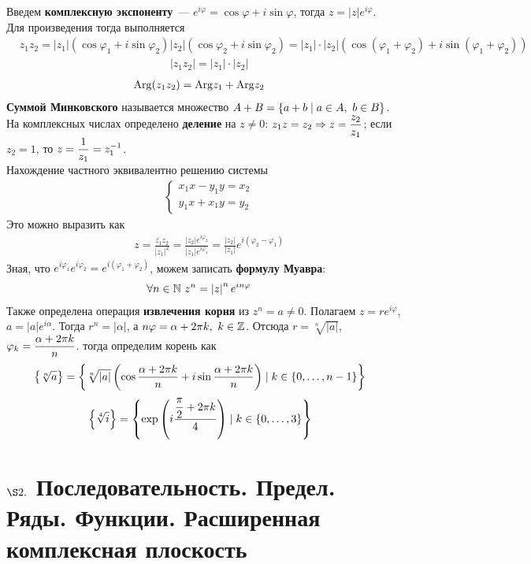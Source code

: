 Введем \textbf{комплексную экспоненту}~--- $e^{i\varphi} = \cos \varphi + i \sin
\varphi$, тогда $z = \left| z \right|e^{i\varphi}$.
\\
Для произведения тогда выполняется
\begin{align*}
  & z_1z_2 = \left| z_1 \right|\left( \cos \varphi_1 + i \sin \varphi_2 \right)\left| z_2 \right|\left( \cos \varphi_2 + i \sin \varphi_2 \right) = \left| z_1 \right|\cdot \left| z_2 \right| \left( \cos \left( \varphi_1+\varphi_2 \right) + i \sin \left( \varphi_1+\varphi_2 \right)\right)
\end{align*}
\begin{align*}
  & \left|z_1z_2\right| = \left| z_1 \right|\cdot \left| z_2 \right|
\end{align*}
\begin{align*}
  & \mathrm{Arg}(z_1z_2) = \mathrm{Arg} z_1 + \mathrm{Arg} z_2
\end{align*}
\textbf{Суммой Минковского} называется множество $A+B = \left\{{a+b \mid a\in A, \
  b \in B}\right\}$.
\\
На комплексных числах определено \textbf{деление} на $z\neq 0$: $z_1z = z_2
\Rightarrow z = \displaystyle \frac{z_2}{z_1}$; если $z_2=1$, то $z = \displaystyle \frac{1}{z_1}
= z_1^{-1}$.
\\
Нахождение частного эквивалентно решению системы
\begin{align*}
  & \left\{ \begin{matrix}
          x_1x-y_1y=x_2 \\
          y_1x+x_1y = y_2
      \end{matrix} \right.
\end{align*}
Это можно выразить как
\begin{align*}
  & z = \frac{\bar{z_1}z_2}{\left| z_1 \right|^2} = \frac{\left| z_2 \right|e^{i \varphi_2}}{\left| z_1 \right| e^{i \varphi_1}} = \frac{\left| z_2 \right|}{\left| z_1 \right|}e^{i\left( \varphi_2-\varphi_1 \right)}
\end{align*}
Зная, что $e^{i \varphi_1}e^{i \varphi_2} = e^{i\left( \varphi_1+\varphi_2
  \right)}$, можем записать \textbf{формулу Муавра}:
\begin{align*}
  & \forall n \in \mathbb{N} \ z^n = \left| z \right|^ne^{i n \varphi} 
\end{align*}
Также определена операция \textbf{извлечения корня} из $z^n = a \neq 0$.
Полагаем $z=re^{i\varphi}$, $a = \left| a \right|e^{i\alpha}$. Тогда $r^n =
\left| \alpha \right|$, а $n \varphi = \alpha + 2 \pi k, \ k \in \mathbb{Z}$. Отсюда $r
= \sqrt[n]{\left| a \right|}$, $\varphi_k = \displaystyle \frac{\alpha+2\pi k}{n}$. тогда
определим корень как
\begin{align*}
  & \left\{{\sqrt[n]{a}}\right\} = \left\{{\sqrt[n]{\left| a \right|}\left( \cos \frac{\alpha + 2 \pi k}{n} + i \sin \frac{\alpha + 2 \pi k}{n} \right)\mid k \in \{0, \dots, n-1\}}\right\}
\end{align*}
\Example
\begin{align*}
  & \left\{{\sqrt[4]{i}}\right\} = \left\{{\exp\left( i \frac{\displaystyle \frac{\pi}{2} + 2 \pi k}{4} \right)\mid k \in \{0, \dots, 3\}}\right\}
\end{align*}
\section{$\S 2.$ Последовательность. Предел. Ряды. Функции. Расширенная
  комплексная плоскость}

